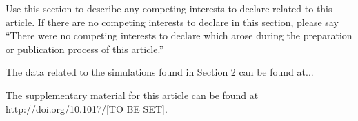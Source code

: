 \documentclass{aptpub}
\begin{document}
\competing %
\noindent Use this section to describe any competing interests to declare related to this article. If there are no competing interests to declare in this section, please say ``There were no competing interests to declare which arose during the preparation or publication process of this article.''



\data %
\noindent The data related to the simulations found in Section 2 can be found at...



\supp \noindent The supplementary material for this article can be found at http://doi.org/10.1017/[TO BE SET]. %



%
%
%
%



\end{document}
